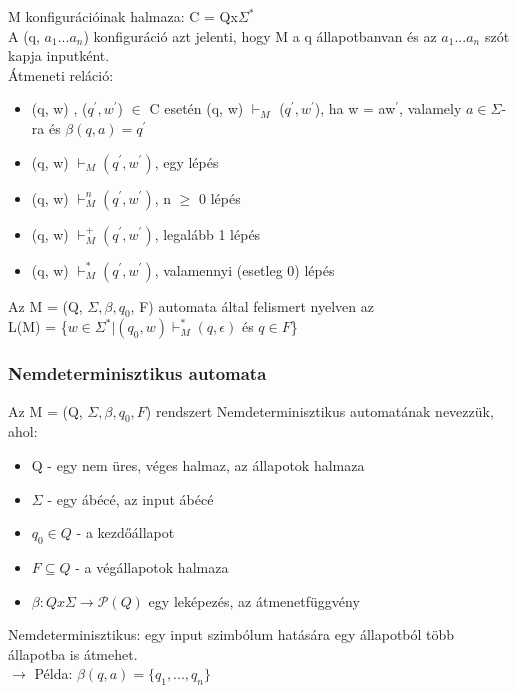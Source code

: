 \documentclass{article}
\begin{document}
    \noindent M konfigurációinak halmaza: C = Qx$ \Sigma^* $ \\ 
    A (q, $a_1...a_n$) konfiguráció azt jelenti, hogy M a q állapotbanvan és az $a_1...a_n$ szót kapja inputként. \\ \newline
    Átmeneti reláció:
    \begin{itemize}
        \item (q, w) , ($ q^{'}, w^{'}$) $ \in $ C esetén (q, w) $ \vdash_M $ ($ q^{'}, w^{'}$), ha w = aw$^{'}$, valamely $ a \in \Sigma $-ra és $ \beta(q, a) = q^{'} $
        \item (q, w) $ \vdash_M (q^{'}, w^{'}) $, egy lépés
        \item (q, w) $ \vdash_M^n (q^{'}, w^{'}) $, n $ \ge $ 0 lépés
        \item (q, w) $ \vdash_M^+ (q^{'}, w^{'}) $, legalább 1 lépés
        \item (q, w) $ \vdash_M^* (q^{'}, w^{'}) $, valamennyi (esetleg 0) lépés
    \end{itemize}

    \noindent Az M = (Q, $ \Sigma, \beta, q_0$, F) automata által felismert nyelven az \\
    L(M) = \{$ w \in \Sigma^* | (q_0, w) \vdash_M^* (q, \epsilon) $ és $ q \in F $\}

    \subsubsection{Nemdeterminisztikus automata}
    Az M = (Q, $ \Sigma, \beta, q_0, F $) rendszert Nemdeterminisztikus automatának nevezzük, ahol:
    \begin{itemize}
        \item Q - egy nem üres, véges halmaz, az állapotok halmaza
        \item $ \Sigma $ - egy ábécé, az input ábécé
        \item $ q_0 \in Q $ - a kezdőállapot
        \item $ F \subseteq Q $ - a végállapotok halmaza
        \item $ \beta: Qx\Sigma \rightarrow \mathcal{P}(Q) $ egy leképezés, az átmenetfüggvény
    \end{itemize}
    \noindent Nemdeterminisztikus: egy input szimbólum hatására egy állapotból több állapotba is átmehet. \\
    $ \rightarrow $ Példa: $ \beta(q, a) = \{q_1,...,q_n\} $

\end{document}
